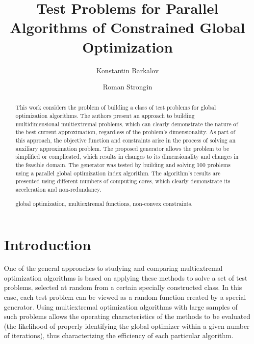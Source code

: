 \documentclass{llncs}
\begin{document}
\mainmatter 

\title{Test Problems for Parallel Algorithms of Constrained Global Optimization }
\author{Konstantin Barkalov \Letter \and Roman Strongin \\
}


\maketitle

\begin{abstract}
This work considers the problem of building a class of test problems for global optimization algorithms. The authors present an approach to building multidimensional multiextremal problems, which can clearly demonstrate the nature of the best current approximation, regardless of the problem’s dimensionality. As part of this approach, the objective function and constraints arise in the process of solving an auxiliary approximation problem. The proposed generator allows the problem to be simplified or complicated, which results in changes to its dimensionality and changes in the feasible domain. The generator was tested by building and solving 100 problems using a parallel global optimization index algorithm. The algorithm's results are presented using different numbers of computing cores, which clearly demonstrate its acceleration and non-redundancy.

\keywords global optimization, multiextremal functions, non-convex constraints.

\end{abstract}

\section{Introduction}

One of the general approaches to studying and comparing multiextremal optimization algorithms is based on applying these methods to solve a set of test problems, selected at random from a certain specially constructed class. In this case, each test problem can be viewed as a random function created by a special generator. Using multiextremal optimization algorithms with large samples of such problems allows the operating characteristics of the methods to be evaluated (the likelihood of properly identifying the global optimizer within a given number of iterations), thus characterizing the efficiency of each particular algorithm.
\end{document}
